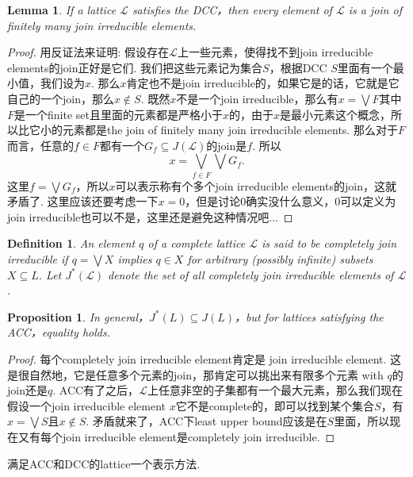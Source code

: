 \documentclass{article}
\newtheorem{lemma}[theorem]{Lemma}
\newtheorem{proposition}[theorem]{Proposition}
\newtheorem{definition}[theorem]{Definition}
\newcommand\lattice{\mathcal{L}}
\begin{document}
\begin{lemma}
\rm If a lattice $\lattice$ satisfies the DCC，then every element of $\lattice$ is a join of finitely many join irreducible elements.
\end{lemma}

\begin{proof}
用反证法来证明: 假设存在$\lattice$上一些元素，使得找不到join irreducible elements的join正好是它们. 我们把这些元素记为集合$S$，根据DCC $S$里面有一个最小值，我们设为$x$. 那么$x$肯定也不是join irreducible的，如果它是的话，它就是它自己的一个join，那么$x \notin S$. 既然$x$不是一个join irreducible，那么有$x = \bigvee F$其中$F$是一个finite set且里面的元素都是严格小于$x$的，由于$x$是最小元素这个概念，所以比它小的元素都是the join of finitely many join irreducible elements. 那么对于$F$而言，任意的$f \in F$都有一个$G_f \subseteq J(\lattice)$的join是$f$. 所以
$$
x = \bigvee\limits_{f \in F}\bigvee G_f.
$$
这里$f = \bigvee G_f$，所以$x$可以表示称有个多个join irreducible elements的join，这就矛盾了. 这里应该还要考虑一下$x = 0$，但是讨论0确实没什么意义，0可以定义为join irreducible也可以不是，这里还是避免这种情况吧...
\end{proof}

\begin{definition}
\rm An element $q$ of a complete lattice $\lattice$ is said to be {\color{red} completely join irreducible} if $q = \bigvee X$ implies $q \in X$ for {\color{red} arbitrary (possibly infinite) subsets} $X \subseteq L$. Let $J^*(\lattice)$ denote the set of all completely join irreducible elements of $\lattice$. 
\end{definition}

\begin{proposition}
\rm In general，$J^{*}(L) \subseteq J(L)$，but for lattices satisfying the ACC，equality holds.
\end{proposition}

\begin{proof}
每个completely join irreducible element肯定是 join irreducible   element. 这是很自然地，它是任意多个元素的join，那肯定可以挑出来有限多个元素 with $q$的join还是$q$. ACC有了之后，$\lattice$上任意非空的子集都有一个最大元素，那么我们现在假设一个join irreducible element $x$它不是complete的，即可以找到某个集合$S$，有$x = \bigvee S$且$x \notin S$. 矛盾就来了，ACC下least upper bound应该是在$S$里面，所以现在又有每个join irreducible element是completely join irreducible.
\end{proof}


{\color{blue} 满足ACC和DCC的lattice一个表示方法}.
\end{document}
